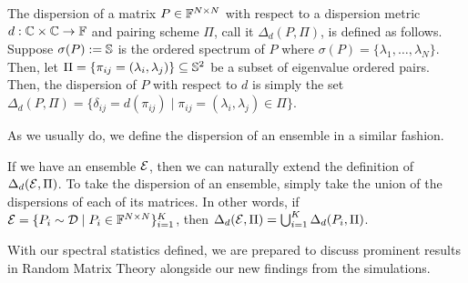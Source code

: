 \begin{definition}[Dispersion]
The dispersion of a matrix $P \in \F^{N \times N}$ with respect to a dispersion metric $d: \Cc \times \Cc \to \F$ and pairing scheme $\Pi$, call it $\Delta_d(P, \Pi)$, is defined as follows. Suppose $\sigma(P) := \S$ is the ordered spectrum of $P$ where $\sigma(P) = \{\lambda_1, \dots, \lambda_N\}$. Then, let $\Pi = \{\pi_{ij} = (\lambda_i,\lambda_j) \} \subseteq \S^2$ be a subset of eigenvalue ordered pairs. Then, the dispersion of $P$ with respect to $d$ is simply the set $\Delta_d(P, \Pi)=\{\delta_{ij} = d(\pi_{ij}) \mid \pi_{ij} = (\lambda_i,\lambda_j) \in \Pi\}$.
\end{definition}

As we usually do, we define the dispersion of an ensemble in a similar fashion. 

\begin{definition}
If we have an ensemble $\Ens$, then we can naturally extend the definition of $\Delta_d(\Ens, \Pi)$. To take the dispersion of an ensemble, simply take the union of the dispersions of each of its matrices. In other words, if $\Ens = \{P_i \sim \mathcal{D} \mid P_i \in \F^{N \times N}\}_{i = 1}^K$, then $\Delta_d(\Ens, \Pi) = \bigcup_{i=1}^K \Delta_d(P_i, \Pi)$.
\end{definition}

With our spectral statistics defined, we are prepared to discuss prominent results in Random Matrix Theory alongside our new findings from the simulations. 







